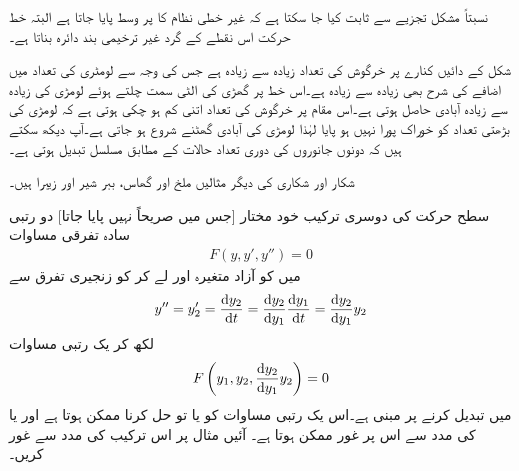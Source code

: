 نسبتاً مشکل تجزیے سے ثابت کیا جا سکتا ہے کہ غیر خطی نظام  کا   پر وسط پایا جاتا ہے البتہ خط حرکت اس نقطے کے گرد غیر ترخیمی بند دائرہ بناتا ہے۔

شکل  کے دائیں کنارے پر خرگوش کی تعداد  زیادہ سے زیادہ ہے جس کی وجہ سے لومٹری کی تعداد  میں اضافے کی شرح بھی زیادہ سے زیادہ ہے۔اس خط پر گھڑی کی الٹی سمت چلتے ہوئے لومڑی کی زیادہ سے زیادہ آبادی حاصل ہوتی ہے۔اس مقام پر خرگوش کی تعداد اتنی کم ہو چکی ہوتی ہے کہ لومڑی کی بڑھتی تعداد کو خوراک پورا نہیں ہو پایا لہٰذا لومڑی کی آبادی گھٹنے شروع ہو جاتی ہے۔آپ دیکھ سکتے ہیں کہ دونوں جانوروں کی دوری تعداد حالات کے مطابق مسلسل تبدیل ہوتی ہے۔

شکار اور شکاری کی دیگر مثالیں ملخ اور گھاس، ببر شیر اور زیبرا ہیں۔


سطح حرکت کی دوسری ترکیب خود مختار [جس میں  صریحاً نہیں پایا جاتا] دو رتبی سادہ تفرقی مساوات
\begin{align*}
F(y,y',y'')=0
\end{align*}
میں  کو آزاد متغیرہ اور  لے کر  کو زنجیری تفرق سے
\begin{align*}
y''=y_2'=\frac{\dif y_2}{\dif t}=\frac{\dif y_2}{\dif y_1}\frac{\dif y_1}{\dif t}=\frac{\dif y_2}{\dif y_1}y_2
\end{align*}
لکھ کر یک رتبی مساوات
\begin{align}
F\left(y_1,y_2,\frac{\dif y_2}{\dif y_1}y_2\right)=0
\end{align}
میں تبدیل کرنے پر مبنی ہے۔اس یک رتبی مساوات کو یا تو حل کرنا ممکن ہوتا ہے اور یا  کی مدد سے اس پر غور ممکن ہوتا ہے۔ آئیں مثال  پر اس ترکیب کی مدد سے غور کریں۔

